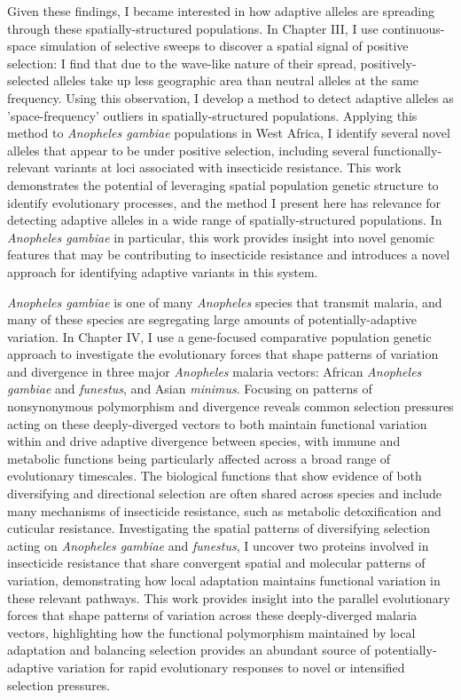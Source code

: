 Given these findings, I became interested in how adaptive alleles
are spreading through these spatially-structured populations. In
Chapter III, I use continuous-space simulation of selective sweeps to 
discover a spatial signal of positive selection: I find that due to the 
wave-like nature of their spread, positively-selected alleles take up less
geographic area than neutral alleles at the same frequency.
Using this observation, I develop a method to 
detect adaptive alleles as 'space-frequency' outliers in spatially-structured populations.
Applying this method to \textit{Anopheles gambiae} populations in 
West Africa, I identify several 
novel alleles that appear to be under positive selection, including several 
functionally-relevant variants at loci associated with insecticide resistance.
This work demonstrates the potential of leveraging spatial population genetic structure to identify 
evolutionary processes, and the method I present here has relevance for
detecting adaptive alleles in a wide range of spatially-structured populations.
In \textit{Anopheles gambiae} in particular, this work provides insight into novel
genomic features that may be contributing to insecticide resistance and 
introduces a novel approach for identifying adaptive variants in this system.

\textit{Anopheles gambiae} is one of many \textit{Anopheles} species that transmit malaria,
and many of these species are segregating large amounts of potentially-adaptive variation.
In Chapter IV, I use a gene-focused comparative population genetic approach to 
investigate the evolutionary forces that shape patterns of variation and divergence in three 
major \textit{Anopheles} malaria vectors: African \textit{Anopheles gambiae} and \textit{funestus}, and Asian \textit{minimus}.
Focusing on patterns of nonsynonymous polymorphism and divergence
reveals common selection pressures acting on these deeply-diverged vectors to both maintain 
functional variation within and drive adaptive divergence between species, with immune and metabolic functions 
being particularly affected across a broad range of evolutionary timescales.
The biological functions that show evidence of both diversifying and directional selection 
are often shared across species and include many mechanisms of insecticide resistance, such as 
metabolic detoxification and cuticular resistance.
Investigating the spatial patterns of diversifying selection acting on \textit{Anopheles gambiae} and \textit{funestus},
I uncover two proteins involved in insecticide resistance that share convergent spatial and molecular patterns of variation,
demonstrating how local adaptation maintains functional variation in these relevant pathways.
This work provides insight into the parallel evolutionary forces that shape patterns of variation 
across these deeply-diverged malaria vectors, highlighting how the functional polymorphism maintained 
by local adaptation and balancing selection provides an abundant source of potentially-adaptive variation 
for rapid evolutionary responses to novel or intensified selection pressures.

